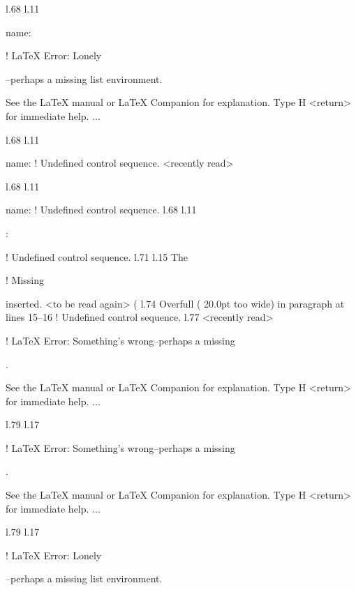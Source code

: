 {{{{l.68 l.11       \item \xmlAttr
                              {name}: \xmlDesc

! LaTeX Error: Lonely \item--perhaps a missing list environment.

See the LaTeX manual or LaTeX Companion for explanation.
Type  H <return>  for immediate help.
 ...                                              
                                                  
l.68 l.11       \item \xmlAttr
                              {name}: \xmlDesc
! Undefined control sequence.
<recently read> \xmlAttr 
                         
l.68 l.11       \item \xmlAttr
                              {name}: \xmlDesc
! Undefined control sequence.
l.68 l.11       \item {}: \xmlDesc
                                              
! Undefined control sequence.
l.71 l.15   The \xmlNode
                        
! Missing { inserted.
<to be read again> 
                   (
l.74 Overfull \hbox (
                     20.0pt too wide) in paragraph at lines 15--16
! Undefined control sequence.
l.77 <recently read> \xmlNode
                             

! LaTeX Error: Something's wrong--perhaps a missing \item.

See the LaTeX manual or LaTeX Companion for explanation.
Type  H <return>  for immediate help.
 ...                                              
                                                  
l.79 l.17     \item \xmlNode
                            

! LaTeX Error: Something's wrong--perhaps a missing \item.

See the LaTeX manual or LaTeX Companion for explanation.
Type  H <return>  for immediate help.
 ...                                              
                                                  
l.79 l.17     \item \xmlNode
                            

! LaTeX Error: Lonely \item--perhaps a missing list environment.

}}}}}
